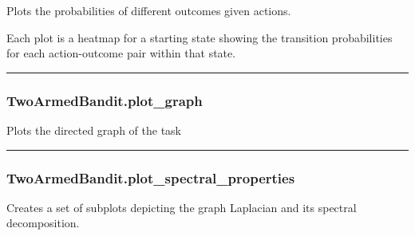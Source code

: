 Plots the probabilities of different outcomes given actions.

Each plot is a heatmap for a starting state showing the transition
probabilities for each action-outcome pair within that state.

\begin{center}\rule{0.5\linewidth}{\linethickness}\end{center}

\subsubsection{TwoArmedBandit.plot\_graph}\label{twoarmedbandit.plot_graph}

\begin{Shaded}
\begin{Highlighting}[]
\OperatorTok{=}\OperatorTok{=}\OperatorTok{=}\OperatorTok{=}\OperatorTok{=}\OperatorTok{=}\OperatorTok{=}\OperatorTok{=}\NormalTok{)}
\end{Highlighting}
\end{Shaded}

Plots the directed graph of the task

\begin{center}\rule{0.5\linewidth}{\linethickness}\end{center}

\subsubsection{TwoArmedBandit.plot\_spectral\_properties}\label{twoarmedbandit.plot_spectral_properties}

\begin{Shaded}
\begin{Highlighting}[]
\OperatorTok{=}\OperatorTok{=}\OperatorTok{=}\NormalTok{)}
\end{Highlighting}
\end{Shaded}

Creates a set of subplots depicting the graph Laplacian and its spectral
decomposition.

